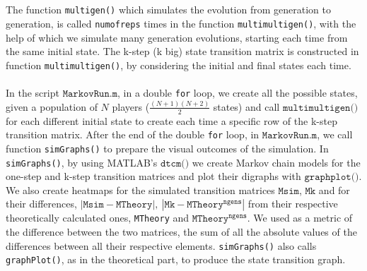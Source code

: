 \documentclass[12pt]{report}
\begin{document}
\\\\
The function \texttt{multigen()} which simulates the evolution from generation to generation, is called \texttt{numofreps} times in the function \texttt{multimultigen()}, with the help of which we simulate many generation evolutions, starting each time from the same initial state. The k-step (k big) state transition matrix is constructed in function \texttt{multimultigen()}, by considering the initial and final states each time.
\\\\
In the script $\texttt{MarkovRun.m}$, in a double \texttt{for} loop, we create all the possible states, given a population of $N$ players ($\frac{(N+1)(N+2)}{2}$ states) and call $\texttt{multimultigen()}$ for each different initial state to create each time a specific row of the k-step transition matrix. After the end of the double \texttt{for} loop, in $\texttt{MarkovRun.m}$, we call function \texttt{simGraphs()} to prepare the visual outcomes of the simulation. In \texttt{simGraphs()}, by using MATLAB's $\texttt{dtcm()}$ we create Markov chain models for the one-step and k-step transition matrices and plot their digraphs with $\texttt{graphplot()}$. We also create heatmaps for the simulated transition matrices $\texttt{Msim}$, $\texttt{Mk}$ and for their differences, $|\texttt{Msim}-\texttt{MTheory}|,\ |\texttt{Mk}-\texttt{MTheory}^{\texttt{ngens}}|$ from their respective theoretically calculated ones, \texttt{MTheory} and $\texttt{MTheory}^{\texttt{ngens}}$. We used as a metric of the difference between the two matrices, the sum of all the absolute values of the differences between all their respective elements. \texttt{simGraphs()} also calls \texttt{graphPlot()}, as in the theoretical part, to produce the state transition graph.
\end{document}
